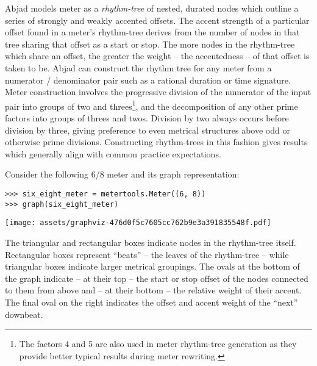 Abjad models meter as a \emph{rhythm-tree} of nested, durated nodes which
outline a series of strongly and weakly accented offsets. The accent strength
of a particular offset found in a meter's rhythm-tree derives from the number
of nodes in that tree sharing that offset as a start or stop. The more nodes in
the rhythm-tree which share an offset, the greater the weight -- the
accentedness -- of that offset is taken to be. Abjad can construct the rhythm
tree for any meter from a numerator / denominator pair such as a rational
duration or time signature. Meter construction involves the progressive
division of the numerator of the input pair into groups of two and
threes\footnote{The factors 4 and 5 are also used in meter rhythm-tree
generation as they provide better typical results during meter rewriting.}, and
the decomposition of any other prime factors into groups of threes and twos.
Division by two always occurs before division by three, giving preference to
even metrical structures above odd or otherwise prime divisions. Constructing
rhythm-trees in this fashion gives results which generally align with common
practice expectations.

Consider the following 6/8 meter and its graph representation:

\begin{comment}
<abjad>
six_eight_meter = metertools.Meter((6, 8))
graph(six_eight_meter)
</abjad>
\end{comment}

\begin{singlespacing}
\vspace{-0.5\baselineskip}
\begin{lstlisting}
>>> six_eight_meter = metertools.Meter((6, 8))
>>> graph(six_eight_meter)
\end{lstlisting}
\noindent\texttt{[image: assets/graphviz-476d0f5c7605cc762b9e3a391835548f.pdf]}
\end{singlespacing}

\noindent The triangular and rectangular boxes indicate nodes in the
rhythm-tree itself. Rectangular boxes represent \enquote{beats} -- the leaves
of the rhythm-tree -- while triangular boxes indicate larger metrical
groupings. The ovals at the bottom of the graph indicate -- at their top -- the
start or stop offset of the nodes connected to them from above and -- at their
bottom -- the relative weight of their accent. The final oval on the right
indicates the offset and accent weight of the \enquote{next} downbeat.

